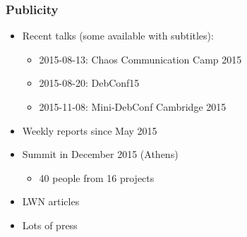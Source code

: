\documentclass[14pt,aspectratio=169]{beamer}
\begin{document}
\begin{frame}
 \frametitle{Publicity}
 \begin{itemize}
  \item Recent talks (some available with subtitles):
   \begin{itemize}
    \item 2015-08-13: Chaos Communication Camp 2015
    \item 2015-08-20: DebConf15
    \item 2015-11-08: Mini-DebConf Cambridge 2015
   \end{itemize}
  \item Weekly reports since May 2015
  \item Summit in December 2015 (Athens)
   \begin{itemize}
    \item 40 people from 16 projects
   \end{itemize}
  \item LWN articles
  \item Lots of press
 \end{itemize}
\end{frame}
\end{document}
